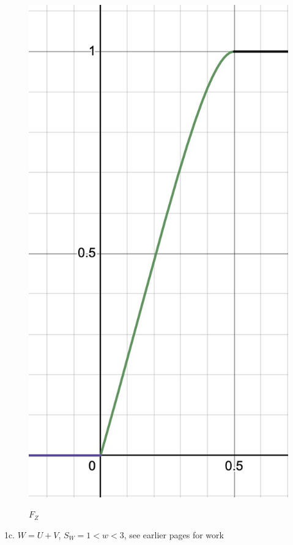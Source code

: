 \documentclass{article} %
\begin{document}
    \begin{figure}[h!]
        \centering
        \includegraphics[scale=0.20]{HW/HW4/p1b.jpg}
        \label{fig:$F_Z$}
        \caption{$F_Z$}    
    \end{figure}
    
    \newpage

    1c. $W=U+V$, $S_W=1 < w < 3$, see earlier pages for work
\end{document}
